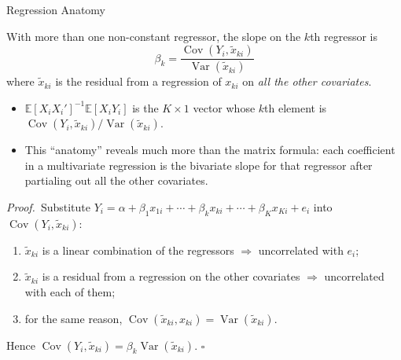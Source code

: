 \documentclass[aspectratio=169,11pt]{beamer}
\newcommand{\E}{\mathbb{E}}
\newcommand{\Var}{\operatorname{Var}}
\newcommand{\Cov}{\operatorname{Cov}}
\newcommand{\PrfLbl}{\textcolor{DeepBlue}{\textit{Proof.}}\ }
\newcommand{\QED}{\hfill$\square$}
\begin{document}
\begin{frame}{Regression Anatomy}
\small

With more than one non-constant regressor, the slope on the $k$th regressor is
\[
\boxed{
\beta_k = \frac{\Cov(Y_i,\tilde x_{ki})}{\Var(\tilde x_{ki})}
}
\tag{3.1.3}
\]
where $\tilde x_{ki}$ is the residual from a regression of $x_{ki}$ on
\emph{all the other covariates}.

\medskip

\begin{itemize}
    \item $\E[X_iX_i']^{-1}\E[X_iY_i]$ is the $K\times1$ vector whose $k$th
    element is $\Cov(Y_i,\tilde x_{ki})/\Var(\tilde x_{ki})$.
    \item This ``anatomy'' reveals much more than the matrix formula:
    \alert{each coefficient in a multivariate regression is the bivariate
    slope for that regressor after partialing out all the other covariates.}
\end{itemize}

\medskip

\PrfLbl Substitute
$Y_i = \alpha + \beta_1x_{1i}+\cdots+\beta_kx_{ki}+\cdots+\beta_Kx_{Ki}+e_i$
into $\Cov(Y_i,\tilde x_{ki})$:
\begin{enumerate}
    \item $\tilde x_{ki}$ is a linear combination of the regressors
    $\Rightarrow$ uncorrelated with $e_i$;
    \item $\tilde x_{ki}$ is a residual from a regression on the other
    covariates $\Rightarrow$ uncorrelated with each of them;
    \item for the same reason, $\Cov(\tilde x_{ki},x_{ki})=\Var(\tilde x_{ki})$.
\end{enumerate}
Hence $\Cov(Y_i,\tilde x_{ki})=\beta_k\Var(\tilde x_{ki})$. \QED

\end{frame}
\end{document}
